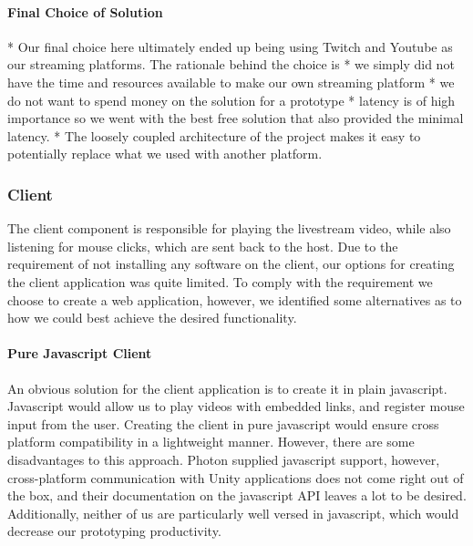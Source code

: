 \paragraph{Final Choice of Solution}
    * Our final choice here ultimately ended up being using Twitch and Youtube as our streaming platforms. The rationale behind the choice is
        * we simply did not have the time and resources available to make our own streaming platform
        * we do not want to spend money on the solution for a prototype
        * latency is of high importance so we went with the best free solution that also provided the minimal latency. 
    * The loosely coupled architecture of the project makes it easy to potentially replace what we used with another platform.






















\subsubsection{Client} %
The client component is responsible for playing the livestream video, while also listening for mouse clicks, which are sent back to the host.
Due to the requirement of not installing any software on the client, our options for creating the client application was quite limited. 
To comply with the requirement we choose to create a web application, however, we identified some alternatives as to how we could best achieve the desired functionality.

\paragraph{Pure Javascript Client}
An obvious solution for the client application is to create it in plain javascript. Javascript would allow us to play videos with embedded links, and register mouse input from the user. Creating the client in pure javascript would ensure cross platform compatibility in a lightweight manner. However, there are some disadvantages to this approach. Photon supplied javascript support, however, cross-platform communication with Unity applications does not come right out of the box\cite{photon_javascript}, and their documentation on the javascript API leaves a lot to be desired. Additionally, neither of us are particularly well versed in javascript, which would decrease our prototyping productivity. 

